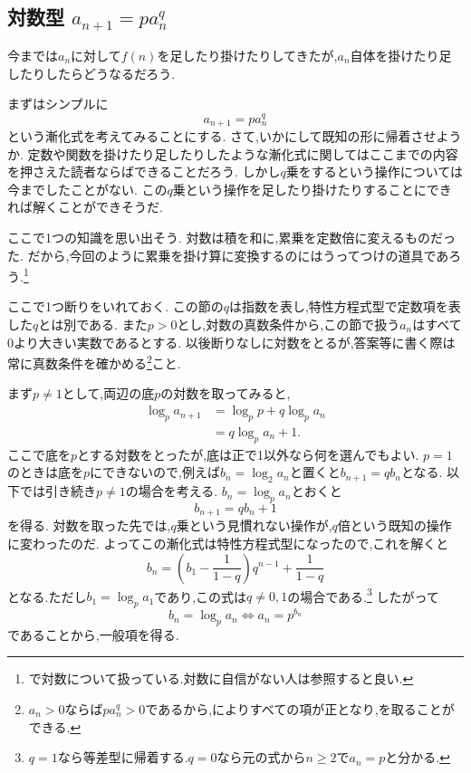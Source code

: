 
\subsection{\texorpdfstring{対数型  $a_{n+1}=pa_n^q$}{対数型}}\label{節：対数型}
  今までは$a_n$に対して$f(n)$を足したり掛けたりしてきたが,$a_n$自体を掛けたり足したりしたらどうなるだろう.

  まずはシンプルに
  \[
    a_{n+1}=pa_n^q
  \]
  という漸化式を考えてみることにする.
  さて,いかにして既知の形に帰着させようか.
  定数や関数を掛けたり足したりしたような漸化式に関してはここまでの内容を押さえた読者ならばできることだろう.
  しかし$q$乗をするという操作については今までしたことがない.
  この$q$乗という操作を足したり掛けたりすることにできれば解くことができそうだ.
  
  ここで1つの知識を思い出そう.
  対数は積を和に,累乗を定数倍に変えるものだった.
  だから,今回のように累乗を掛け算に変換するのにはうってつけの道具であろう.\footnote{ で対数について扱っている.対数に自信がない人は参照すると良い.}

  ここで1つ断りをいれておく.
  この節の$q$は指数を表し,特性方程式型で定数項を表した$q$とは別である.
  また$p>0$とし,対数の真数条件から,この節で扱う$a_n$はすべて0より大きい実数であるとする.
  以後断りなしに対数をとるが,答案等に書く際は常に真数条件を確かめる\footnote{$a_n>0$ならば$p a_n^q>0$であるから,によりすべての項が正となり,を取ることができる.}こと.

  まず$p\ne1$として,両辺の底$p$の対数を取ってみると,
  \begin{align*}
      \log_pa_{n+1}&=\log_pp+q\log_pa_n\\
      &=q\log_pa_n+1.
  \end{align*}
  ここで底を$p$とする対数をとったが,底は正で1以外なら何を選んでもよい.
  $p=1$のときは底を$p$にできないので,例えば$b_n=\log_2a_n$と置くと$b_{n+1}=qb_n$となる.
  以下では引き続き$p\ne1$の場合を考える.
  $b_n=\log_pa_n$とおくと
  \[
    b_{n+1}=qb_n+1
  \]
  を得る.
  対数を取った先では,$q$乗という見慣れない操作が,$q$倍という既知の操作に変わったのだ.
  よってこの漸化式は特性方程式型になったので,これを解くと
  \[
    b_n=\left(b_1-\frac{1}{1-q}\right)q^{n-1}+\frac{1}{1-q}
  \]
  となる.ただし$b_1=\log_pa_1$であり,この式は$q\ne0,1$の場合である.\footnote{$q=1$なら等差型に帰着する.$q=0$なら元の式から$n\ge2$で$a_n=p$と分かる.}
  したがって
  \[
    b_n=\log_p a_n  \iff a_n=p^{b_n}
  \]
  であることから,一般項を得る.

